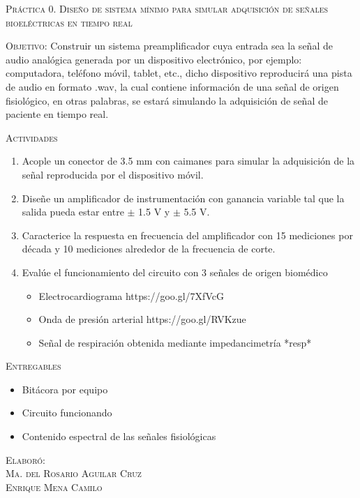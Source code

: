 \documentclass[10pt,letterpaper,spanish,twoside]{report}
\begin{document}
\docdate

\begin{center}
 \textsc{\asignatura}\vspace{.2em}
\end{center}

\textsc{Práctica 0. Diseño de sistema mínimo para simular adquisición de señales bioeléctricas en tiempo real}

\textsc{Objetivo:} Construir un sistema preamplificador cuya entrada sea la señal de audio analógica generada por un dispositivo electrónico, por ejemplo: computadora, teléfono móvil, tablet, etc., dicho dispositivo reproducirá una pista de audio en formato .wav, la cual contiene información de una señal de origen fisiológico, en otras palabras, se estará simulando la adquisición de señal de paciente en tiempo real.

\textsc{Actividades}
\begin{enumerate}
  \item Acople un conector de 3.5 mm con caimanes para simular la adquisición de la señal reproducida por el dispositivo móvil.
  \item Diseñe un amplificador de instrumentación con ganancia variable tal que la salida pueda estar entre $\pm$ 1.5 V y $\pm$ 5.5 V.
  \item Caracterice la respuesta en frecuencia del amplificador con 15 mediciones por década y 10 mediciones alrededor de la frecuencia de corte.
  \item Evalúe el funcionamiento del circuito con 3 señales de origen biomédico
  \begin{itemize}
  	\item Electrocardiograma \hspace{3 cm}https://goo.gl/7XfVcG
  	\item Onda de presión arterial \hspace{3 cm} https://goo.gl/RVKzue
  	\item Señal de respiración obtenida mediante  impedancimetría \hspace{3 cm} *resp*
  \end{itemize}
\end{enumerate}

\textsc{Entregables}
\begin{itemize}
  \item Bitácora por equipo
  \item Circuito funcionando
  \item Contenido espectral de las señales fisiológicas
\end{itemize}


\vfill
\begin{flushright}
\textsc{Elaboró:\\
Ma. del Rosario Aguilar Cruz\\
Enrique Mena Camilo}
\end{flushright}
\end{document}
